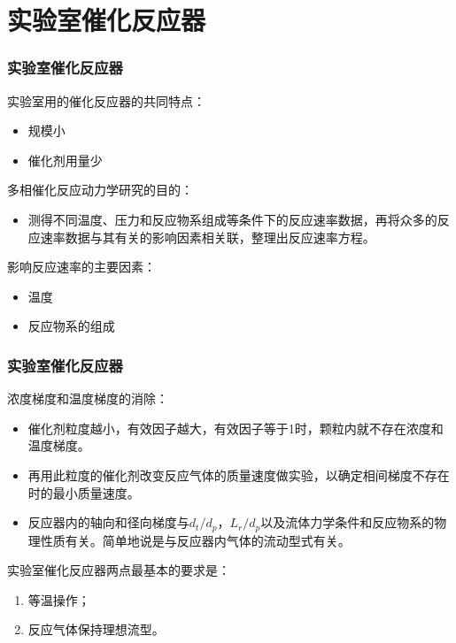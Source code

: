 \section{实验室催化反应器}


\begin{frame}
    \frametitle{实验室催化反应器}

    实验室用的催化反应器的共同特点：
    \begin{itemize}
        \item 规模小
        \item 催化剂用量少
    \end{itemize}

    \bigskip
    多相催化反应动力学研究的目的：
    \begin{itemize}
        \item 测得不同温度、压力和反应物系组成等条件下的反应速率数据，再将众多的反应速率数据与其有关的影响因素相关联，整理出反应速率方程。
    \end{itemize}
    \bigskip
    影响反应速率的主要因素：
    \begin{itemize}
        \item 温度
        \item 反应物系的组成
    \end{itemize}

\end{frame}



\begin{frame}
    \frametitle{实验室催化反应器}

    浓度梯度和温度梯度的消除：
    \begin{itemize}
        \item 催化剂粒度越小，有效因子越大，有效因子等于1时，颗粒内就不存在浓度和温度梯度。
        \item 再用此粒度的催化剂改变反应气体的质量速度做实验，以确定相间梯度不存在时的最小质量速度。
        \item 反应器内的轴向和径向梯度与$d_t/d_p$，$L_r/d_p$以及流体力学条件和反应物系的物理性质有关。简单地说是与反应器内气体的流动型式有关。
    \end{itemize}
    \bigskip
    实验室催化反应器两点最基本的要求是：
    \begin{enumerate}
        \item 等温操作；
        \item 反应气体保持理想流型。
    \end{enumerate}

\end{frame}



